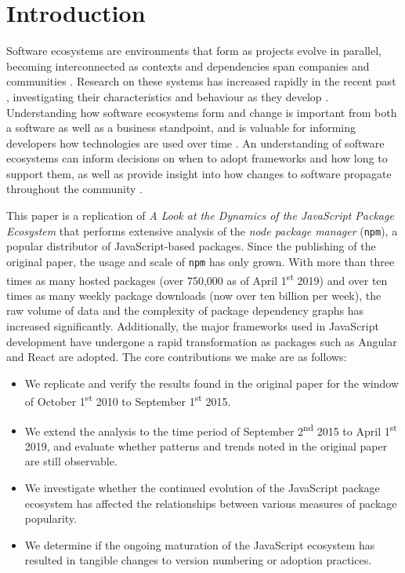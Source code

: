 \documentclass[10pt,conference]{IEEEtran}
\def\code#1{\texttt{#1}}
\begin{document}
\section{Introduction}
Software ecosystems are environments that form as projects evolve in parallel,
becoming interconnected as contexts and dependencies span companies and communities \cite{LUNGU2010264}. 
Research on these systems has increased rapidly in the recent past \cite{Manikas:2017}, investigating
their characteristics and behaviour as they develop \cite{Manikas:2013}. Understanding how software
ecosystems form and change is important from both a software as well as a business standpoint\cite{Messerschmitt},
and is valuable for informing developers how technologies are used over time \cite{Serebrenik:2015}. 
An understanding of software ecosystems can inform decisions on when to adopt frameworks and how long
to support them, as well as provide insight into how changes to software propagate throughout the community \cite{Wittern:2016}.

This paper is a replication of \emph{A Look at the Dynamics of the JavaScript Package Ecosystem}\cite{Wittern:2016} that performs extensive analysis of 
the \emph{node package manager} (\code{npm}), a popular distributor of JavaScript-based packages. Since the publishing of the original paper, the usage and scale of \code{npm} has only grown. With more than three times as many hosted packages (over 750,000 as of April 1\textsuperscript{st} 2019) 
and over ten times as many weekly package downloads (now over ten billion per week), the raw volume of data and the complexity of package dependency graphs has increased significantly. 
Additionally, the major frameworks used in JavaScript development have undergone a rapid transformation as packages such as Angular and React are adopted\footnotemark[\ref{adoption}].
The core contributions we make are as follows:
\begin{itemize}
  \item We replicate and verify the results found in the original paper for the window of October 1\textsuperscript{st} 2010 to September 1\textsuperscript{st} 2015.
  \item We extend the analysis to the time period of September 2\textsuperscript{nd} 2015 to April 1\textsuperscript{st} 2019, and evaluate whether patterns and trends noted in the original paper are still observable.
  \item We investigate whether the continued evolution of the JavaScript package ecosystem has affected the relationships between various measures of package popularity.
  \item We determine if the ongoing maturation of the JavaScript ecosystem has resulted in tangible changes to version numbering or adoption practices.
\end{itemize}
\end{document}
